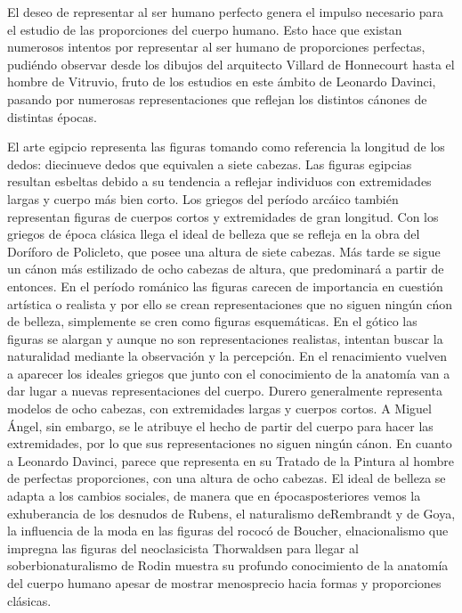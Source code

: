 \documentclass[a4paper,12pt]{article} %
\begin{document}
El deseo de representar al ser humano perfecto genera el impulso necesario para el estudio de las proporciones del cuerpo humano. Esto hace que existan numerosos intentos por representar al ser humano de proporciones perfectas, pudiéndo observar desde los dibujos del arquitecto Villard de Honnecourt hasta el hombre de Vitruvio, fruto de los estudios en este ámbito de Leonardo Davinci, pasando por numerosas representaciones que reflejan los distintos cánones de distintas épocas.

El arte egipcio representa las figuras tomando como referencia la longitud de los dedos: diecinueve dedos que equivalen a siete cabezas. Las figuras egipcias resultan esbeltas debido a su tendencia a reflejar individuos con extremidades largas y cuerpo más bien corto. Los griegos del período arcáico también representan figuras de cuerpos cortos y extremidades de gran longitud.
Con los griegos de época clásica llega el ideal de belleza que se refleja en la obra del Doríforo de Policleto, que posee una altura de siete cabezas. Más tarde se sigue un cánon más estilizado de ocho cabezas de altura, que predominará a partir de entonces.
En el período románico las figuras carecen de importancia en cuestión artística o realista y por ello se crean representaciones que no siguen ningún cńon de belleza, simplemente se cren como figuras esquemáticas.
En el gótico las figuras se alargan y aunque no son representaciones realistas, intentan buscar la naturalidad mediante la observación y la percepción.
En el renacimiento vuelven a aparecer los ideales griegos que junto con el conocimiento de la anatomía van a dar lugar a nuevas representaciones del cuerpo. Durero generalmente representa modelos de ocho cabezas, con extremidades largas y cuerpos cortos. A Miguel Ángel, sin embargo, se le atribuye el hecho de partir del cuerpo para hacer las extremidades, por lo que sus representaciones no siguen ningún cánon. En cuanto a Leonardo Davinci, parece que representa en su Tratado de la Pintura al hombre de perfectas proporciones, con una altura de ocho cabezas.
El ideal de belleza se adapta a los cambios sociales, de manera que en épocasposteriores vemos la exhuberancia de los desnudos de Rubens, el naturalismo deRembrandt y de Goya, la influencia de la moda en las figuras del rococó de Boucher, elnacionalismo que impregna las figuras del neoclasicista Thorwaldsen para llegar al soberbionaturalismo de Rodin muestra su profundo conocimiento de la anatomía del cuerpo humano apesar de mostrar menosprecio hacia formas y proporciones clásicas.
\end{document}
